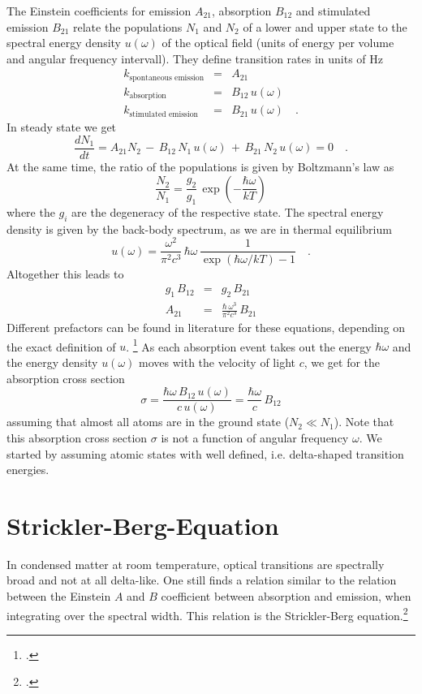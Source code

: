 The Einstein coefficients for emission $A_{21}$, absorption $B_{12}$ and stimulated emission $B_{21}$ relate the populations $N_1$ and $N_2$ of a lower and upper state to the spectral energy density $u(\omega)$ of the optical field (units of energy per volume and angular frequency intervall). They define transition rates in units of Hz
\begin{eqnarray*}
 k_{\text{spontaneous emission}} &=& A_{21} \\
  k_{\text{absorption}}  & = & B_{12} \,   u(\omega) \\
  k_{\text{stimulated emission }} & =&  B_{21} \,  u(\omega)  \quad .
\end{eqnarray*}
%
In steady state we get
\[
 \frac{d N_1}{dt} =  A_{21} N_2 \, - \, B_{12} \, N_1 \, u(\omega) \, + \, B_{21}\, N_2 \,u(\omega)  = 0 \quad .
\]
At the same time, the ratio of the populations is given by Boltzmann's law as
\[
 \frac{N_2}{N_1} = \frac{g_2}{g_1} \, \exp \left( - \frac{\hbar \omega}{kT} \right)
\]
where the $g_i$ are the degeneracy of the respective state. The spectral energy density is given by the back-body spectrum, as we are in thermal equilibrium
\[
 u(\omega) = \frac{\omega^2}{\pi^2 c^3} \, \hbar \omega \, \frac{1}{\exp \left( \hbar \omega / kT \right) - 1} \quad .
\]
Altogether this leads to 
\begin{eqnarray*}
 g_1 \, B_{12} &=& g_2 \, B_{21} \\
 A_{21} &=&  \frac{\hbar \, \omega^3}{\pi^2 c^3} \, B_{21} 
\end{eqnarray*}
Different prefactors can be found in literature for these equations, depending on the exact definition of $u$.
 \footcite{Hilborn:2002wj} 
 As each absorption event takes out the energy $\hbar \omega$ and the energy density $u(\omega)$ moves with the velocity of light $c$, we get for the absorption cross section
\[
 \sigma = \frac{\hbar \omega \, B_{12} \, u(\omega)  }{c \, u(\omega) }  =
   \frac{\hbar \omega  }{c  }    \, B_{12}
\]
assuming that almost all atoms are in the ground state ($N_2 \ll N_1$). Note that this absorption cross section $\sigma$ is not a function of angular frequency $\omega$. We started by assuming atomic states with well defined, i.e. delta-shaped transition energies.



\section{Strickler-Berg-Equation} 


In condensed matter at room temperature, optical transitions are spectrally broad and not at all delta-like. One still finds a relation similar to the relation between the Einstein $A$ and $B$ coefficient between absorption and emission, when integrating over the spectral width. This relation is the  Strickler-Berg equation.\footcite[chapter 5.3][]{Strickler_Berg, Parson}  


